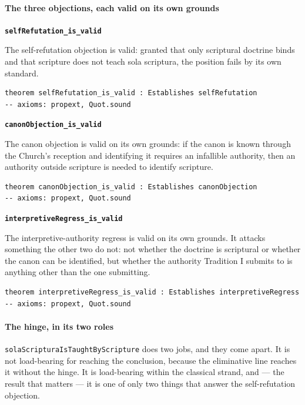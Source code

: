 \documentclass[11pt]{article}
\begin{document}
\paragraph*{The three objections, each valid on its own grounds}
\leavevmode\par
\par\medskip\noindent\textbf{\texttt{self\allowbreak{}Refutation\_\allowbreak{}is\_\allowbreak{}valid}}\par\nobreak\noindent
The self-refutation objection is valid: granted that only scriptural doctrine binds and that scripture does not teach sola scriptura, the position fails by its own standard.

{\small\begin{verbatim}
theorem selfRefutation_is_valid : Establishes selfRefutation
-- axioms: propext, Quot.sound
\end{verbatim}}
\par\medskip\noindent\textbf{\texttt{canon\allowbreak{}Objection\_\allowbreak{}is\_\allowbreak{}valid}}\par\nobreak\noindent
The canon objection is valid on its own grounds: if the canon is known through the Church's reception and identifying it requires an infallible authority, then an authority outside scripture is needed to identify scripture.

{\small\begin{verbatim}
theorem canonObjection_is_valid : Establishes canonObjection
-- axioms: propext, Quot.sound
\end{verbatim}}
\par\medskip\noindent\textbf{\texttt{interpretive\allowbreak{}Regress\_\allowbreak{}is\_\allowbreak{}valid}}\par\nobreak\noindent
The interpretive-authority regress is valid on its own grounds. It attacks something the other two do not: not whether the doctrine is scriptural or whether the canon can be identified, but whether the authority Tradition I submits to is anything other than the one submitting.

{\small\begin{verbatim}
theorem interpretiveRegress_is_valid : Establishes interpretiveRegress
-- axioms: propext, Quot.sound
\end{verbatim}}
\paragraph*{The hinge, in its two roles}
\leavevmode\par
\texttt{sola\allowbreak{}Scriptura\allowbreak{}Is\allowbreak{}Taught\allowbreak{}By\allowbreak{}Scripture} does two jobs, and they come apart. It is not load-bearing for reaching the conclusion, because the eliminative line reaches it without the hinge. It is load-bearing within the classical strand, and — the result that matters — it is one of only two things that answer the self-refutation objection.
\end{document}
